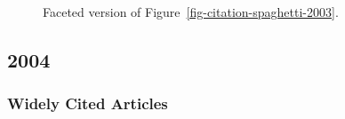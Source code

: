 \documentclass[
  10pt,
  letterpaper,
  DIV=11,
  numbers=noendperiod,
  twoside]{scrartcl}
\begin{document}
\begin{figure}


\caption{\label{fig-citation-facet-2003}Faceted version of
Figure~\ref{fig-citation-spaghetti-2003}.}

\end{figure}%

\newpage

\subsection{2004}\label{sec-s2004}

\subsubsection*{Widely Cited Articles}\label{widely-cited-articles-48}
\end{document}
